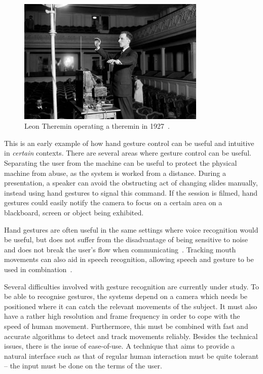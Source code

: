 \begin{figure}[]
\center
\includegraphics[width=0.8\textwidth] {bilder/teremin.jpg}
\caption{Leon Theremin operating a theremin in 1927~\cite{theremin}.}
\label{theremin}
\end{figure}

This is an early example of how hand gesture control can be useful and intuitive in \emph{certain} contexts. There are several areas where gesture control can be useful. Separating the user from the machine can be useful to protect the physical machine from abuse, as the system is worked from a distance. During a presentation, a speaker can avoid the obstructing act of changing slides manually, instead using hand gestures to signal this command. If the session is filmed, hand gestures could easily notify the camera to focus on a certain area on a blackboard, screen or object being exhibited.

Hand gestures are often useful in the same settings where voice recognition would be useful, but does not suffer from the disadvantage of being sensitive to noise and does not break the user's flow when communicating~\cite{Hardenberg01bare-handhuman-computer}. Tracking mouth movements can also aid in speech recognition, allowing speech and gesture to be used in combination~\cite{conf/icmcs/LiuK10, conf/icmcs/SarginAKOYWEYT06}.

Several difficulties involved with gesture recognition are currently under study. To be able to recognise gestures, the systems depend on a camera which needs be positioned where it can catch the relevant movements of the subject. It must also have a rather high resolution and frame frequency in order to cope with the speed of human movement. Furthermore, this must be combined with fast and accurate algorithms to detect and track movements reliably. Besides the technical issues, there is the issue of ease-of-use. A technique that aims to provide a natural interface such as that of regular human interaction must be quite tolerant -- the input must be done on the terms of the user. 

